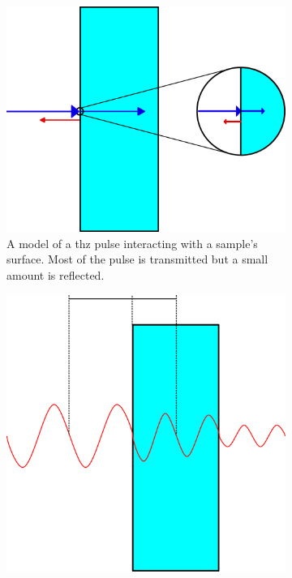\begin{figure}
\centering
\begin{subfigure}{0.49\textwidth}
    \centering
    \includegraphics[scale=0.6]{Figures/Misc/Theory/TransferModel_Basic.png}
    \captionsetup{font = footnotesize, justification = centering}
    \caption{A model of a \acrshort{thz} pulse interacting with a sample’s surface. Most of the pulse is transmitted but a small amount is reflected.}
    \label{fig:transfermodel1}
\end{subfigure}
\begin{subfigure}{0.49\textwidth}
    \centering
    \includegraphics[scale=0.6]{Figures/Misc/Theory/WaveAttenuation.png}

\end{subfigure}
\end{figure}
